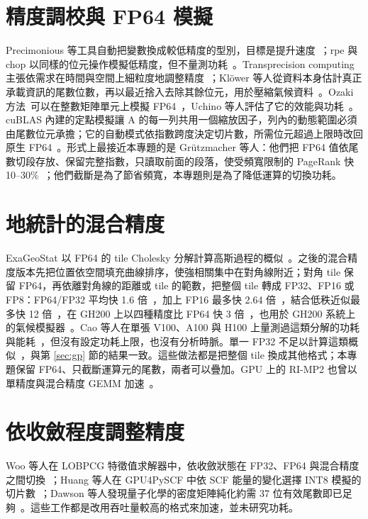 \section{精度調校與 FP64 模擬}\label{sec:rw-precision}

Precimonious 等工具自動把變數換成較低精度的型別，目標是提升速度~\cite{RubioGonzalez2013}；rpe 與 chop 以同樣的位元操作模擬低精度，但不量測功耗~\cite{Dawson2017,Higham2019}。Transprecision computing 主張依需求在時間與空間上細粒度地調整精度~\cite{Malossi2018}；Klöwer 等人從資料本身估計真正承載資訊的尾數位數，再以最近捨入去除其餘位元，用於壓縮氣候資料~\cite{Klower2021}。Ozaki 方法~\cite{Ozaki2012}可以在整數矩陣單元上模擬 FP64~\cite{Ootomo2024,Ozaki2025}，Uchino 等人評估了它的效能與功耗~\cite{Uchino2025}。cuBLAS 內建的定點模擬讓 A 的每一列共用一個縮放因子，列內的動態範圍必須由尾數位元承擔；它的自動模式依指數跨度決定切片數，所需位元超過上限時改回原生 FP64~\cite{cuBLASEmu,Schwarz2026}。形式上最接近本專題的是 Grützmacher 等人：他們把 FP64 值依尾數切段存放、保留完整指數，只讀取前面的段落，使受頻寬限制的 PageRank 快 10–30\%~\cite{Grutzmacher2020}；他們截斷是為了節省頻寬，本專題則是為了降低運算的切換功耗。

\section{地統計的混合精度}\label{sec:rw-geostat}

ExaGeoStat 以 FP64 的 tile Cholesky 分解計算高斯過程的概似~\cite{Abdulah2018}。之後的混合精度版本先把位置依空間填充曲線排序，使強相關集中在對角線附近；對角 tile 保留 FP64，再依離對角線的距離或 tile 的範數，把整個 tile 轉成 FP32、FP16 或 FP8：FP64/FP32 平均快 1.6 倍~\cite{Abdulah2019}，加上 FP16 最多快 2.64 倍~\cite{Abdulah2022}，結合低秩近似最多快 12 倍~\cite{Cao2022}，在 GH200 上以四種精度比 FP64 快 3 倍~\cite{Ren2025}，也用於 GH200 系統上的氣候模擬器~\cite{Abdulah2024}。Cao 等人在單張 V100、A100 與 H100 上量測過這類分解的功耗與能耗~\cite{Cao2023}，但沒有設定功耗上限，也沒有分析時脈。單一 FP32 不足以計算這類概似~\cite{Abdulah2022}，與第 \ref{sec:gp} 節的結果一致。這些做法都是把整個 tile 換成其他格式；本專題保留 FP64、只截斷運算元的尾數，兩者可以疊加。GPU 上的 RI-MP2 也曾以單精度與混合精度 GEMM 加速~\cite{OlivaresAmaya2010}。

\section{依收斂程度調整精度}\label{sec:rw-adaptive}

Woo 等人在 LOBPCG 特徵值求解器中，依收斂狀態在 FP32、FP64 與混合精度之間切換~\cite{Woo2023}；Huang 等人在 GPU4PySCF 中依 SCF 能量的變化選擇 INT8 模擬的切片數~\cite{Huang2026}；Dawson 等人發現量子化學的密度矩陣純化約需 37 位有效尾數即已足夠~\cite{Dawson2024}。這些工作都是改用吞吐量較高的格式來加速，並未研究功耗。

